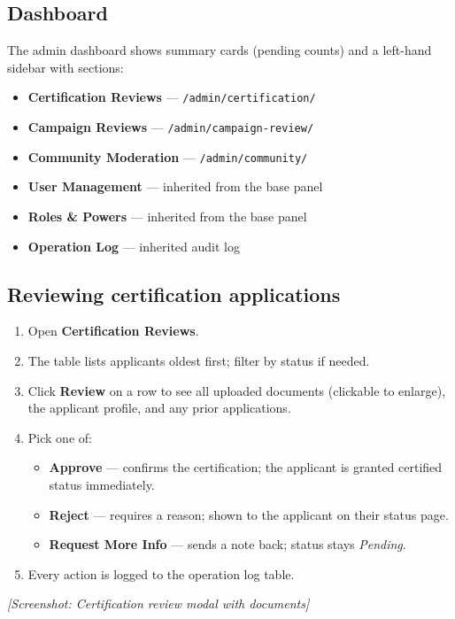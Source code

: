 \subsection{Dashboard}
The admin dashboard shows summary cards (pending counts) and a left-hand
sidebar with sections:
\begin{itemize}
  \item \textbf{Certification Reviews} — \texttt{/admin/certification/}
  \item \textbf{Campaign Reviews} — \texttt{/admin/campaign-review/}
  \item \textbf{Community Moderation} — \texttt{/admin/community/}
  \item \textbf{User Management} — inherited from the base panel
  \item \textbf{Roles \& Powers} — inherited from the base panel
  \item \textbf{Operation Log} — inherited audit log
\end{itemize}

\subsection{Reviewing certification applications}
\begin{enumerate}
  \item Open \textbf{Certification Reviews}.
  \item The table lists applicants oldest first; filter by status if
        needed.
  \item Click \textbf{Review} on a row to see all uploaded documents
        (clickable to enlarge), the applicant profile, and any prior
        applications.
  \item Pick one of:
        \begin{itemize}
          \item \textbf{Approve} — confirms the certification; the
                applicant is granted certified status immediately.
          \item \textbf{Reject} — requires a reason; shown to the
                applicant on their status page.
          \item \textbf{Request More Info} — sends a note back; status
                stays \emph{Pending}.
        \end{itemize}
  \item Every action is logged to the operation log table.
\end{enumerate}

\textit{[Screenshot: Certification review modal with documents]}

